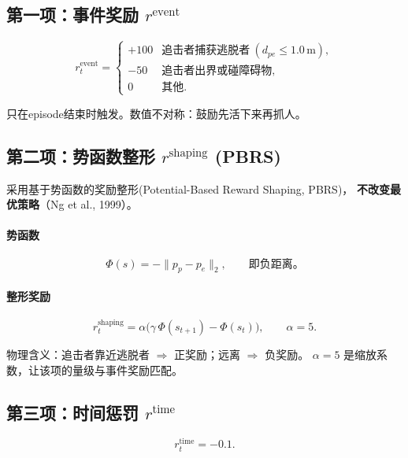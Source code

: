 \documentclass[11pt]{article}
\begin{document}
\subsection{第一项：事件奖励 $r^{\text{event}}$}

\begin{equation}
  r_t^{\text{event}} =
  \begin{cases}
    +100 & \text{追击者捕获逃脱者}\ (d_{pe} \le 1.0\,\text{m}),\\
    -50  & \text{追击者出界或碰障碍物},\\
    0    & \text{其他}.
  \end{cases}
\end{equation}

只在episode结束时触发。数值不对称：鼓励先活下来再抓人。

\subsection{第二项：势函数整形 $r^{\text{shaping}}$ (PBRS)}

采用基于势函数的奖励整形(Potential-Based Reward Shaping, PBRS)，
\textbf{不改变最优策略}（Ng et al., 1999）。

\paragraph{势函数}
\begin{equation}
  \Phi(s) = -\|p_p - p_e\|_2, \qquad \text{即负距离。}
\end{equation}

\paragraph{整形奖励}
\begin{equation}
  r_t^{\text{shaping}} = \alpha \big(\gamma\,\Phi(s_{t+1}) - \Phi(s_t)\big),
  \qquad \alpha = 5.
\end{equation}

物理含义：追击者靠近逃脱者 $\Rightarrow$ 正奖励；远离 $\Rightarrow$ 负奖励。
$\alpha=5$ 是缩放系数，让该项的量级与事件奖励匹配。

\subsection{第三项：时间惩罚 $r^{\text{time}}$}

\begin{equation}
  r_t^{\text{time}} = -0.1.
\end{equation}
\end{document}
